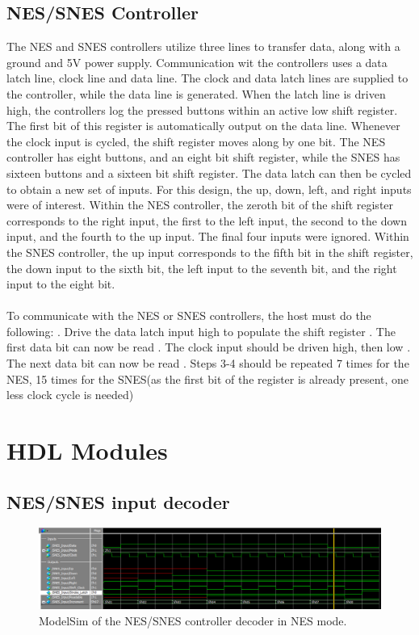 \documentclass[]{article}
\begin{document}
\subsection{NES/SNES Controller}
The NES and SNES controllers utilize three lines to transfer data, along with a ground and 5V power supply. Communication wit the controllers uses a data latch line, clock line and data line. The clock and data latch lines are supplied to the controller, while the data line is generated. When the latch line is driven high, the controllers log the pressed buttons within an active low shift register. The first bit of this register is automatically output on the data line. Whenever the clock input is cycled, the shift register moves along by one bit. The NES controller has eight buttons, and an eight bit shift register, while the SNES has sixteen buttons and a sixteen bit shift register. The data latch can then be cycled to obtain a new set of inputs. For this design, the up, down, left, and right inputs were of interest. Within the NES controller, the zeroth bit of the shift register corresponds to the right input, the first to  the left input, the second to the down input, and the fourth to the up input. The final four inputs were ignored. Within the SNES controller, the up input corresponds to the fifth bit in the shift register, the down input to the sixth bit, the left input to the seventh bit, and the right input to the eight bit. \\~\\
To communicate with the NES or SNES controllers, the host must do the following:
. Drive the data latch input high to populate the shift register
. The first data bit can now be read
. The clock input should be driven high, then low
. The next data bit can now be read
. Steps 3-4 should be repeated 7 times for the NES, 15 times for the SNES(as the first bit of the register is already present, one less clock cycle is needed)

\section{HDL Modules}
\subsection{NES/SNES input decoder}
\begin{figure}[H]
	\includegraphics[width=\linewidth]{NES_Input_Sim.png}
	\caption{ModelSim of the NES/SNES controller decoder in NES mode.}
\end{figure}
\end{document}

